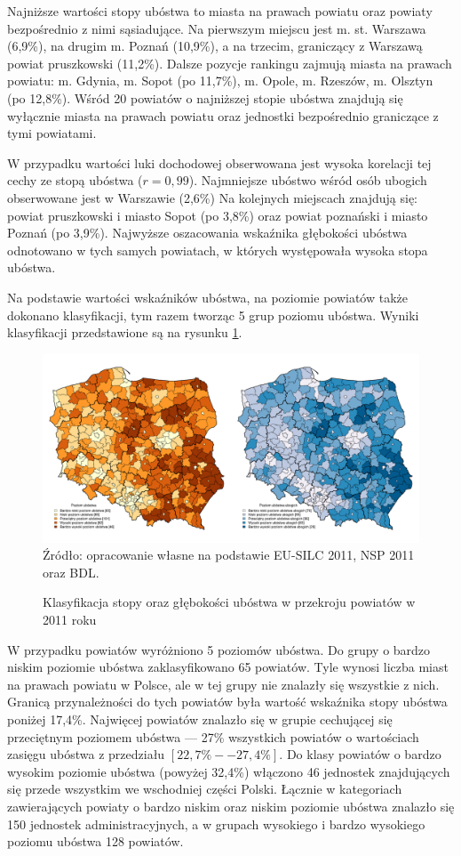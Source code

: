 Najniższe wartości stopy ubóstwa to miasta na prawach powiatu oraz powiaty bezpośrednio z nimi sąsiadujące. Na pierwszym miejscu jest m. st. Warszawa (6,9\%), na drugim m. Poznań (10,9\%), a na trzecim, graniczący z Warszawą powiat pruszkowski (11,2\%). Dalsze pozycje rankingu zajmują miasta na prawach powiatu: m. Gdynia, m. Sopot (po 11,7\%), m. Opole, m. Rzeszów, m. Olsztyn (po 12,8\%). Wśród 20 powiatów o najniższej stopie ubóstwa znajdują się wyłącznie miasta na prawach powiatu oraz jednostki bezpośrednio graniczące z tymi powiatami.

W przypadku wartości luki dochodowej obserwowana jest wysoka korelacji tej cechy ze stopą ubóstwa ($r=0,99$). Najmniejsze ubóstwo wśród osób ubogich obserwowane jest w Warszawie (2,6\%) Na kolejnych miejscach znajdują się: powiat pruszkowski i miasto Sopot (po 3,8\%) oraz powiat poznański i miasto Poznań (po 3,9\%). Najwyższe oszacowania wskaźnika głębokości ubóstwa odnotowano w tych samych powiatach, w których występowała wysoka stopa ubóstwa. 

Na podstawie wartości wskaźników ubóstwa, na poziomie powiatów także dokonano klasyfikacji, tym razem tworząc 5 grup poziomu ubóstwa. Wyniki klasyfikacji przedstawione są na rysunku \ref{fig:eb_nts4_hcr_pgi_k5}.

\begin{figure}[ht]
\caption{Klasyfikacja stopy oraz głębokości ubóstwa w przekroju powiatów w 2011 roku}
\centering
\includegraphics[width=\textwidth]{05_wykresy/eb_nts4_hcr_pgi_k5.png}\\
\small{Źródło: opracowanie własne na podstawie EU-SILC 2011, NSP 2011 oraz BDL.}
\label{fig:eb_nts4_hcr_pgi_k5}
\end{figure}

W przypadku powiatów wyróżniono 5 poziomów ubóstwa. Do grupy o bardzo niskim poziomie ubóstwa zaklasyfikowano 65 powiatów. Tyle wynosi liczba miast na prawach powiatu w Polsce, ale w tej grupy nie znalazły się wszystkie z nich. Granicą przynależności do tych powiatów była wartość wskaźnika stopy ubóstwa poniżej 17,4\%. Najwięcej powiatów znalazło się w grupie cechującej się przeciętnym poziomem ubóstwa --- 27\% wszystkich powiatów o wartościach zasięgu ubóstwa z przedziału $[22,7\% -- 27,4\%]$. Do klasy powiatów o bardzo wysokim poziomie ubóstwa (powyżej 32,4\%) włączono 46 jednostek znajdujących się przede wszystkim we wschodniej części Polski. Łącznie w kategoriach zawierających powiaty o bardzo niskim oraz niskim poziomie ubóstwa znalazło się 150 jednostek administracyjnych, a w grupach wysokiego i bardzo wysokiego poziomu ubóstwa 128 powiatów. 

